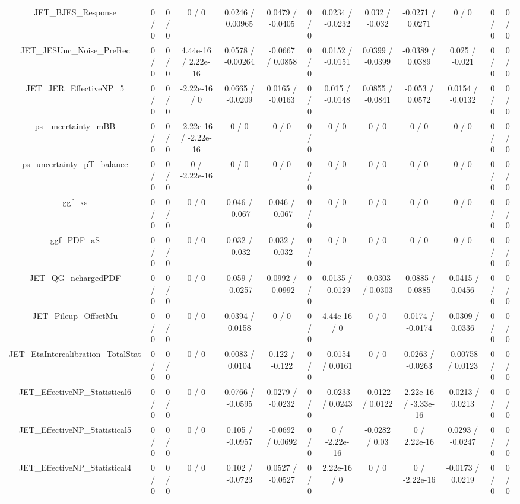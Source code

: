 \documentclass[10pt]{article}
\begin{document}
\begin{table}[htbp]
\begin{center}
\begin{tabular}{|c|c|c|c|c|c|c|c|c|c|c|c|c|}
  JET_BJES_Response & 0 / 0 & 0 / 0 & 0 / 0 & 0.0246 / 0.00965 & 0.0479 / -0.0405 & 0 / 0 & 0.0234 / -0.0232 & 0.032 / -0.032 & -0.0271 / 0.0271 & 0 / 0 & 0 / 0 & 0 / 0 \\ 
  JET_JESUnc_Noise_PreRec & 0 / 0 & 0 / 0 & 4.44e-16 / 2.22e-16 & 0.0578 / -0.00264 & -0.0667 / 0.0858 & 0 / 0 & 0.0152 / -0.0151 & 0.0399 / -0.0399 & -0.0389 / 0.0389 & 0.025 / -0.021 & 0 / 0 & 0 / 0 \\ 
  JET_JER_EffectiveNP_5 & 0 / 0 & 0 / 0 & -2.22e-16 / 0 & 0.0665 / -0.0209 & 0.0165 / -0.0163 & 0 / 0 & 0.015 / -0.0148 & 0.0855 / -0.0841 & -0.053 / 0.0572 & 0.0154 / -0.0132 & 0 / 0 & 0 / 0 \\ 
  ps_uncertainty_mBB & 0 / 0 & 0 / 0 & -2.22e-16 / -2.22e-16 & 0 / 0 & 0 / 0 & 0 / 0 & 0 / 0 & 0 / 0 & 0 / 0 & 0 / 0 & 0 / 0 & 0 / 0 \\ 
  ps_uncertainty_pT_balance & 0 / 0 & 0 / 0 & 0 / -2.22e-16 & 0 / 0 & 0 / 0 & 0 / 0 & 0 / 0 & 0 / 0 & 0 / 0 & 0 / 0 & 0 / 0 & 0 / 0 \\ 
  ggf_xs & 0 / 0 & 0 / 0 & 0 / 0 & 0.046 / -0.067 & 0.046 / -0.067 & 0 / 0 & 0 / 0 & 0 / 0 & 0 / 0 & 0 / 0 & 0 / 0 & 0 / 0 \\ 
  ggf_PDF_aS & 0 / 0 & 0 / 0 & 0 / 0 & 0.032 / -0.032 & 0.032 / -0.032 & 0 / 0 & 0 / 0 & 0 / 0 & 0 / 0 & 0 / 0 & 0 / 0 & 0 / 0 \\ 
  JET_QG_nchargedPDF & 0 / 0 & 0 / 0 & 0 / 0 & 0.059 / -0.0257 & 0.0992 / -0.0992 & 0 / 0 & 0.0135 / -0.0129 & -0.0303 / 0.0303 & -0.0885 / 0.0885 & -0.0415 / 0.0456 & 0 / 0 & 0 / 0 \\ 
  JET_Pileup_OffsetMu & 0 / 0 & 0 / 0 & 0 / 0 & 0.0394 / 0.0158 & 0 / 0 & 0 / 0 & 4.44e-16 / 0 & 0 / 0 & 0.0174 / -0.0174 & -0.0309 / 0.0336 & 0 / 0 & 0 / 0 \\ 
  JET_EtaIntercalibration_TotalStat & 0 / 0 & 0 / 0 & 0 / 0 & 0.0083 / 0.0104 & 0.122 / -0.122 & 0 / 0 & -0.0154 / 0.0161 & 0 / 0 & 0.0263 / -0.0263 & -0.00758 / 0.0123 & 0 / 0 & 0 / 0 \\ 
  JET_EffectiveNP_Statistical6 & 0 / 0 & 0 / 0 & 0 / 0 & 0.0766 / -0.0595 & 0.0279 / -0.0232 & 0 / 0 & -0.0233 / 0.0243 & -0.0122 / 0.0122 & 2.22e-16 / -3.33e-16 & -0.0213 / 0.0213 & 0 / 0 & 0 / 0 \\ 
  JET_EffectiveNP_Statistical5 & 0 / 0 & 0 / 0 & 0 / 0 & 0.105 / -0.0957 & -0.0692 / 0.0692 & 0 / 0 & 0 / -2.22e-16 & -0.0282 / 0.03 & 0 / 2.22e-16 & 0.0293 / -0.0247 & 0 / 0 & 0 / 0 \\ 
  JET_EffectiveNP_Statistical4 & 0 / 0 & 0 / 0 & 0 / 0 & 0.102 / -0.0723 & 0.0527 / -0.0527 & 0 / 0 & 2.22e-16 / 0 & 0 / 0 & 0 / -2.22e-16 & -0.0173 / 0.0219 & 0 / 0 & 0 / 0 \\ 

\end{tabular}
\end{center}
\end{table}
\end{document}

